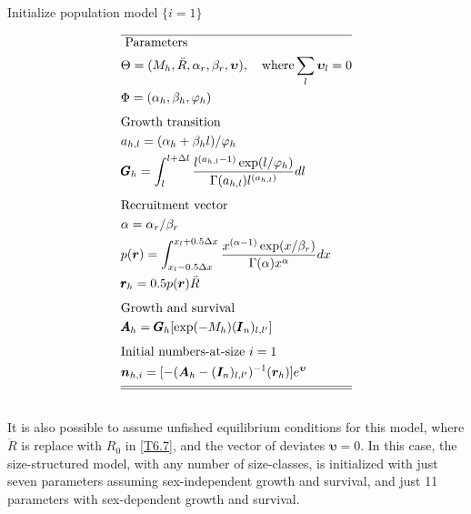 \documentclass[12pt,letterpaper]{article}
\newcounter{saveEq}
\def\putEq{\setcounter{saveEq}{\value{equation}}}
\def\getEq{\setcounter{equation}{\value{saveEq}}}
\def\tableEq{ %
    \putEq \setcounter{equation}{0}
    \renewcommand{\theequation}{T\arabic{table}.\arabic{equation}}
    \vspace{-5mm}
    }
\def\normalEq{ %
    \getEq
    \renewcommand{\theequation}{\arabic{section}.\arabic{equation}}}
\begin{document}
      \begin{table}
      \centering
      \caption{ Initialize population model $\{i=1\}$ }
      \label{tab:initial_numbers}
      \tableEq
      \begin{align}
        \hline \nonumber
        &\mbox{ Parameters } \\
        &\Theta = (M_h,\ddot{R},\alpha_r,\beta_r, \bm{\upsilon})
        ,\quad\mbox{where} \sum_l \bm{\upsilon}_l = 0 \label{T6.1} \\
        &\Phi = (\alpha_h,\beta_h,\varphi_h)\\[1ex]
        &\mbox{Growth transition}\nonumber \\
        &a_{h,l} = (\alpha_h + \beta_h l)/\varphi_h \label{T6.3} \\
        &\pmb{G}_h= \int_{l}^{l+\Delta l}
        \frac{ l^{(a_{h,l}-1)} \exp(l/\varphi_h) }
        { \Gamma(a_{h,l}) l^{(a_{h,l})} } dl \label{T6.4} \\[1ex]
        &\mbox{Recruitment vector} \nonumber \\
        & \alpha = \alpha_r / \beta_r \label{T6.5} \\
        &p(\boldsymbol{r}) = \int_{x_l-0.5\Delta x}^{x_l+0.5\Delta x}
        \frac{x^{(\alpha-1)}\exp(x / \beta_r)}{\Gamma(\alpha)x^\alpha}dx
        \label{T6.6}\\
        &\pmb{r}_h = 0.5 p(\boldsymbol{r}) \ddot{R} \label{T6.7}\\[1ex]
         &\mbox{Growth and survival} \nonumber \\
        &\pmb{A}_h = \pmb{G}_h [\exp(-M_h) (\pmb{I}_n)_{l,l'}]\label{T6.8}\\[1ex]
        &\mbox{Initial numbers-at-size $i=1$} \nonumber \\
        &\bm{n}_{h,i} = [-(\bm{A}_h - (\bm{I}_n)_{l,l'})^{-1} (\bm{r}_h)] e^{\bm{\upsilon}} \label{T6.9}\\[1ex]
        \hline \hline \nonumber
      \end{align}
      \normalEq
      \end{table}

      It is also possible to assume unfished equilibrium conditions for this model, where $\ddot{R}$ is replace with $R_0$ in \eqref{T6.7}, and the vector of deviates $\bm{\upsilon} = 0$.  In this case, the size-structured model, with any number of size-classes, is initialized with just seven parameters assuming sex-independent growth and survival, and just 11 parameters with sex-dependent growth and survival.
\end{document}
